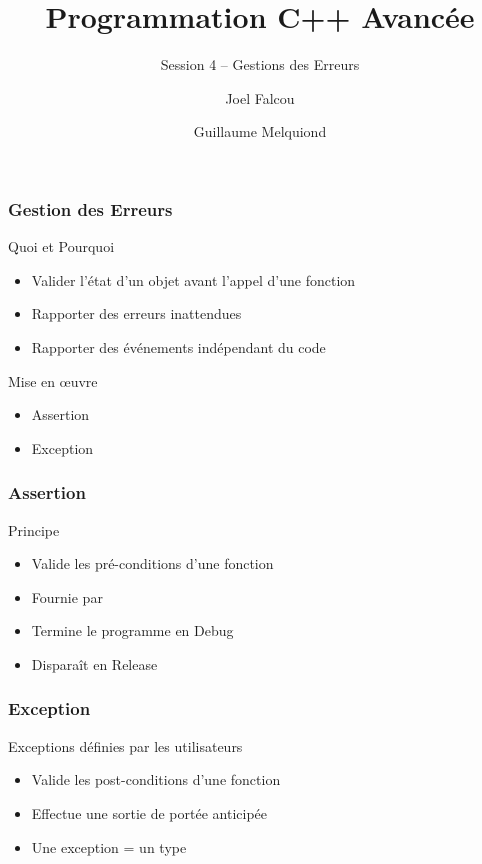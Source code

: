 \documentclass[svgnames]{beamer}
\title{Programmation C++ Avancée}
\subtitle{Session 4 -- Gestions des Erreurs}
\author{Joel Falcou \and Guillaume Melquiond}
\institute{Laboratoire de Recherche en Informatique}
\date{}
\begin{document}


\begin{frame}[plain]
\titlepage
\end{frame}
\setcounter{framenumber}{0}

\frame
{
  \frametitle{Gestion des Erreurs}
  \begin{block}{Quoi et Pourquoi}
  \begin{itemize}
  \item Valider l'état d'un objet avant l'appel d'une fonction
  \item Rapporter des erreurs inattendues
  \item Rapporter des événements indépendant du code
  \end{itemize}
  \end{block}
 
  \begin{block}{Mise en \oe{uvre}}
  \begin{itemize}
  \item Assertion
  \item Exception
  \end{itemize}
  \end{block}
}

\frame
{
  \frametitle{Assertion}
  \begin{block}{Principe}
  \begin{itemize}
  \item Valide les \alert{pré-conditions} d'une fonction
  \item Fournie par 
  \item Termine le programme en Debug
  \item Disparaît en Release
  \end{itemize}
  \end{block}

  \begin{overlayarea}{\textwidth}{4cm}
  \end{overlayarea}
}

\frame
{
  \frametitle{Exception}
  \begin{block}{Exceptions définies par les utilisateurs}
  \begin{itemize}
  \item Valide les \alert{post-conditions} d'une fonction
  \item Effectue une sortie de portée anticipée
  \item Une exception = un type
  \end{itemize}
  \end{block}

  \begin{overlayarea}{\textwidth}{5cm}
  \end{overlayarea}
}
\end{document}
